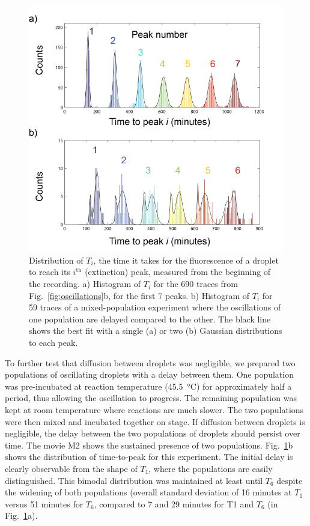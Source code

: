 \documentclass[prl,aps,reprint,
 amsmath,amssymb,superscriptaddress]{revtex4-1}
\begin{document}
\begin{figure}
\includegraphics{peaks}
\caption{Distribution of  $T_i$, the time it takes for the fluorescence of a droplet to reach its $i^\text{th}$  (extinction)  peak, measured from the beginning of the recording. a) Histogram of $T_i$ for the 690 traces from Fig.~\ref{fig:oscillations}b, for the first 7 peaks. b) Histogram of $T_i$ for 59 traces of a mixed-population experiment where the oscillations of one population are delayed compared to the other. The black line shows the best fit with a single (a) or two (b) Gaussian distributions to each peak.}
\label{fig:peaks}
\end{figure}

To further test that diffusion between droplets was negligible, we prepared two populations of oscillating droplets with a delay between them. One population was pre-incubated at reaction temperature (\SI{45.5}{\celsius}) for approximately half a period, thus allowing the oscillation to progress. The remaining population was kept at room temperature where reactions are much slower. The two populations were then mixed and incubated together on stage. If diffusion between droplets is negligible, the delay between the two populations of droplets should persist over time. The movie M2 shows the sustained presence of two populations. Fig.~\ref{fig:peaks}b shows the distribution of time-to-peak for this experiment. The initial delay is clearly observable from the shape of $T_1$, where the populations are easily distinguished. This bimodal distribution was maintained at least until $T_6$ despite the widening of both populations (overall standard deviation of 16 minutes at $T_1$ versus 51 minutes for $T_6$, compared to 7 and 29 minutes for T1 and $T_6$ (in Fig.~\ref{fig:peaks}a).
\end{document}

